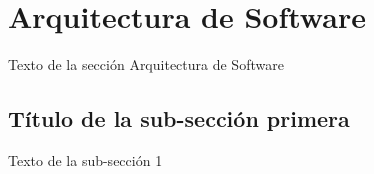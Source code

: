 \section{Arquitectura de Software}

Texto de la sección Arquitectura de Software


\subsection{Título de la sub-sección primera}

Texto de la sub-sección 1
